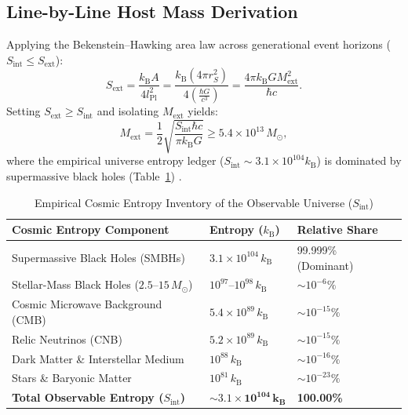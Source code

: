 \documentclass[11pt,a4paper]{article}
\theoremstyle{definition}
\begin{document}
\subsection{Line-by-Line Host Mass Derivation}\label{sec:mass_derivation}
Applying the Bekenstein--Hawking area law across generational event horizons ($S_{\text{int}} \le S_{\text{ext}}$):
\begin{equation}\label{eq:entropy_formula}
    S_{\text{ext}} = \frac{k_{\text{B}} A}{4 l_{\text{Pl}}^2} = \frac{k_{\text{B}} (4\pi r_S^2)}{4 \left(\frac{\hbar G}{c^3}\right)} = \frac{4\pi k_{\text{B}} G M_{\text{ext}}^2}{\hbar c}.
\end{equation}
Setting $S_{\text{ext}} \ge S_{\text{int}}$ and isolating $M_{\text{ext}}$ yields:
\begin{equation}\label{eq:parent_bound}
    M_{\text{ext}} = \frac{1}{2}\sqrt{\frac{S_{\text{int}} \hbar c}{\pi k_{\text{B}} G}} \ge 5.4 \times 10^{13} \, M_\odot,
\end{equation}
where the empirical universe entropy ledger ($S_{\text{int}} \sim 3.1 \times 10^{104} k_{\text{B}}$) is dominated by supermassive black holes (Table~\ref{table:entropy_ledger}) \cite{egan2010}.

\begin{table}[H]
\centering
\caption{Empirical Cosmic Entropy Inventory of the Observable Universe ($S_{\text{int}}$)}\label{table:entropy_ledger}
\begin{tabular}{p{6.2cm}p{4.8cm}p{3.5cm}}
\toprule
\textbf{Cosmic Entropy Component} & \textbf{Entropy ($k_{\text{B}}$)} & \textbf{Relative Share} \\
\midrule
Supermassive Black Holes (SMBHs) & $3.1 \times 10^{104} \, k_{\text{B}}$ & 99.999\% (Dominant) \\
Stellar-Mass Black Holes ($2.5\text{--}15 \, M_\odot$) & $10^{97}\text{--}10^{98} \, k_{\text{B}}$ & $\sim 10^{-6}\%$ \\
Cosmic Microwave Background (CMB) & $5.4 \times 10^{89} \, k_{\text{B}}$ & $\sim 10^{-15}\%$ \\
Relic Neutrinos (CNB) & $5.2 \times 10^{89} \, k_{\text{B}}$ & $\sim 10^{-15}\%$ \\
Dark Matter \& Interstellar Medium & $10^{88} \, k_{\text{B}}$ & $\sim 10^{-16}\%$ \\
Stars \& Baryonic Matter & $10^{81} \, k_{\text{B}}$ & $\sim 10^{-23}\%$ \\
\midrule
\textbf{Total Observable Entropy ($S_{\text{int}}$)} & $\mathbf{\sim 3.1 \times 10^{104} \, k_{\text{B}}}$ & \textbf{100.00\%} \\
\bottomrule
\end{tabular}
\end{table}
\end{document}
